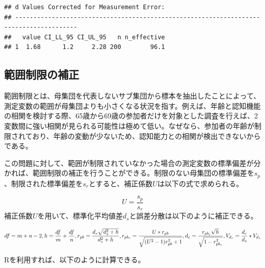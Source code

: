 \documentclass[
  ja=standard, xelatex, base=12pt]{bxjsreport}
\begin{document}
\begin{verbatim}
## d Values Corrected for Measurement Error:
## ---------------------------------------------------------------------------------------
##   value CI_LL_95 CI_UL_95   n n_effective
## 1  1.68      1.2     2.28 200        96.1
\end{verbatim}

\hypertarget{ux7bc4ux56f2ux5236ux9650ux306eux88dcux6b63-1}{%
\subsection{範囲制限の補正}\label{ux7bc4ux56f2ux5236ux9650ux306eux88dcux6b63-1}}

範囲制限とは、母集団を代表しないサブ集団から標本を抽出したことによって、測定変数の範囲が母集団よりも小さくなる状況を指す。例えば、年齢と認知機能の相関を検討する際、65歳から69歳の参加者だけを対象とした調査を行えば、2変数間に強い相関が見られる可能性は極めて低い。なぜなら、参加者の年齢が制限されており、年齢の変動が少ないため、認知能力との相関が検出できないからである。

この問題に対して、範囲が制限されていなかった場合の測定変数の標準偏差が分かれば、範囲制限の補正を行うことができる。制限のない母集団の標準偏差を\(s_p\)、制限された標準偏差を\(s_r\)とすると、補正係数\(U\)は以下の式で求められる。

\[
U=\frac{s_p}{s_r}
\] 補正係数\(U\)を用いて、標準化平均値差\(d_s\)と誤差分散は以下のように補正できる。

\[
df=m+n-2, \\
h=\frac{df}{m}+\frac{df}{n},  \\
r_{pb}=\frac{d_s\sqrt{d_s^2+h}}{d_s^2+h}, \\
r_{pb_c}=\frac{U*r_{pb}}{\sqrt{(U^2-1)r_{pb}^2+1}},\\
d_c=\frac{r_{pb_c}\sqrt{h}}{\sqrt{1-r_{pb_c}^2}}, \\
V_{d_c}=\frac{d_c}{d_s}*V_{d_s}
\]

Rを利用すれば、以下のように計算できる。
\end{document}
